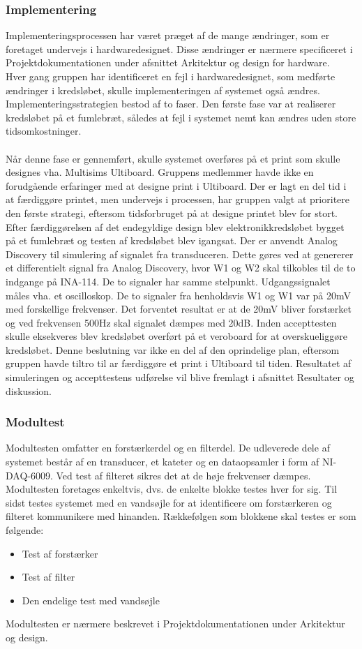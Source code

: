 \subsubsection{Implementering}
Implementeringsprocessen har været præget af de mange ændringer, som er foretaget undervejs i hardwaredesignet. Disse ændringer er nærmere specificeret i Projektdokumentationen under afsnittet Arkitektur og design for hardware. \\
Hver gang gruppen har identificeret en fejl i hardwaredesignet, som medførte ændringer i kredsløbet, skulle implementeringen af systemet også ændres. Implementeringsstrategien bestod af to faser. Den første fase var at realiserer kredsløbet på et fumlebræt, således at fejl i systemet nemt kan ændres uden store tidsomkostninger. \\\\
Når denne fase er gennemført, skulle systemet overføres på et print som skulle designes vha. Multisims Ultiboard. Gruppens medlemmer havde ikke en forudgående erfaringer med at designe print i Ultiboard. Der er lagt en del tid i at færdiggøre printet, men undervejs i processen, har gruppen valgt at prioritere den første strategi, eftersom tidsforbruget på at designe printet blev for stort. \\
Efter færdiggørelsen af det endegyldige design blev elektronikkredsløbet bygget på et fumlebræt og testen af kredsløbet blev igangsat. Der er anvendt Analog Discovery til simulering af signalet fra transduceren. Dette gøres ved at genererer et differentielt signal fra Analog Discovery, hvor W1 og W2 skal tilkobles til de to indgange på INA-114. De to signaler har samme stelpunkt. Udgangssignalet måles vha. et oscilloskop. De to signaler fra henholdsvis W1 og W1 var på 20mV med forskellige frekvenser. Det forventet resultat er at de 20mV bliver forstærket og ved frekvensen 500Hz skal signalet dæmpes med 20dB. Inden accepttesten skulle eksekveres blev kredsløbet overført på et veroboard for at overskueliggøre kredsløbet. Denne beslutning var ikke en del af den oprindelige plan, eftersom gruppen havde tiltro til ar færdiggøre et print i Ultiboard til tiden. Resultatet af simuleringen og accepttestens udførelse vil blive fremlagt i afsnittet Resultater og diskussion. 
\subsubsection{Modultest}
Modultesten omfatter en forstærkerdel og en filterdel. De udleverede dele af systemet består af en transducer, et kateter og en dataopsamler i form af NI-DAQ-6009. Ved test af filteret sikres det at de høje frekvenser dæmpes. Modultesten foretages enkeltvis, dvs. de enkelte blokke testes hver for sig. Til sidst testes systemet med en vandsøjle for at identificere om forstærkeren og filteret kommunikere med hinanden. Rækkefølgen som blokkene skal testes er som følgende:
\begin{itemize}
\item Test af forstærker
\item Test af filter
\item Den endelige test med vandsøjle
\end{itemize}
Modultesten er nærmere beskrevet i Projektdokumentationen under Arkitektur og design.
